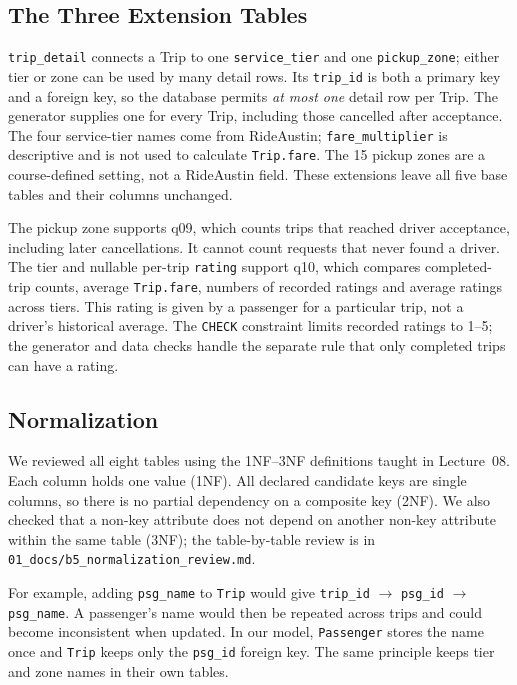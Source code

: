\subsection{The Three Extension Tables}
\texttt{trip\_detail} connects a Trip to one \texttt{service\_tier} and one \texttt{pickup\_zone}; either tier or zone can be used by many detail rows. Its \texttt{trip\_id} is both a primary key and a foreign key, so the database permits \emph{at most one} detail row per Trip. The generator supplies one for every Trip, including those cancelled after acceptance. The four service-tier names come from RideAustin; \texttt{fare\_multiplier} is descriptive and is not used to calculate \texttt{Trip.fare}. The 15 pickup zones are a course-defined setting, not a RideAustin field. These extensions leave all five base tables and their columns unchanged.

The pickup zone supports q09, which counts trips that reached driver acceptance, including later cancellations. It cannot count requests that never found a driver. The tier and nullable per-trip \texttt{rating} support q10, which compares completed-trip counts, average \texttt{Trip.fare}, numbers of recorded ratings and average ratings across tiers. This rating is given by a passenger for a particular trip, not a driver's historical average. The \texttt{CHECK} constraint limits recorded ratings to 1--5; the generator and data checks handle the separate rule that only completed trips can have a rating.

\subsection{Normalization}
We reviewed all eight tables using the 1NF--3NF definitions taught in Lecture~08. Each column holds one value (1NF). All declared candidate keys are single columns, so there is no partial dependency on a composite key (2NF). We also checked that a non-key attribute does not depend on another non-key attribute within the same table (3NF); the table-by-table review is in \texttt{01\_docs/b5\_normalization\_review.md}.

For example, adding \texttt{psg\_name} to \texttt{Trip} would give \texttt{trip\_id} $\rightarrow$ \texttt{psg\_id} $\rightarrow$ \texttt{psg\_name}. A passenger's name would then be repeated across trips and could become inconsistent when updated. In our model, \texttt{Passenger} stores the name once and \texttt{Trip} keeps only the \texttt{psg\_id} foreign key. The same principle keeps tier and zone names in their own tables.
